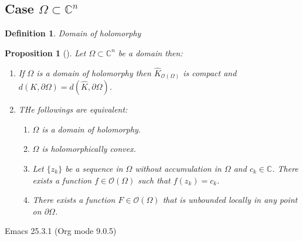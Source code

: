 \documentclass[11pt]{article}
\newtheorem{proposition}{Proposition}[theorem]
\newtheorem{definition}{Definition}
\begin{document}
\subsection{Case \(\Omega\subset \mathbb{C}^n\)}
\label{sec:org263e9b2}
\begin{definition}
Domain of holomorphy
\end{definition}

\begin{proposition}[]
\label{prop:}
Let \(\Omega\subset \mathbb{C}^n\) be a domain then:
\begin{enumerate}
\item If \(\Omega\) is a domain of holomorphy then \(\hat K_{\mathcal{O}(\Omega)}\) is
compact and \(d(K, \partial \Omega) = d(\hat K,\partial\Omega)\).
\item THe followings are equivalent:
\begin{enumerate}
\item \(\Omega\) is a domain of holomorphy.
\item \(\Omega\) is holomorphically convex.
\item Let \(\{z_k\}\) be a sequence in \(\Omega\) without accumulation in \(\Omega\)
and \(c_k\in \mathbb{C}\). There exists a function \(f\in \mathcal{O}(\Omega)\)
such that \(f(z_k)=c_k\).
\item There exists a function \(F\in \mathcal{O}(\Omega)\) that is unbounded locally in
any point on \(\partial\Omega\).
\end{enumerate}
\end{enumerate}
\end{proposition}
Emacs 25.3.1 (Org mode 9.0.5)
\end{document}
